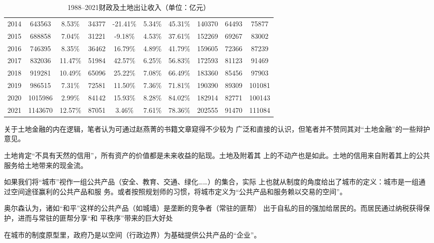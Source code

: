 \begin{table}[h]
{\begin{tabular}{@{}cccccccccc@{}}
2014 & 643563  & 8.53\%  & 34377 & -21.41\%  & 5.34\% & 45.31\% & 140370 & 64493 & 75877  \\
2015 & 688858  & 7.04\%  & 31221 & -9.18\%   & 4.53\% & 37.61\% & 152269 & 69267 & 83002  \\
2016 & 746395  & 8.35\%  & 36462 & 16.79\%   & 4.89\% & 41.79\% & 159605 & 72366 & 87239  \\
2017 & 832036  & 11.47\% & 51984 & 42.57\%   & 6.25\% & 56.83\% & 172593 & 81123 & 91469  \\
2018 & 919281  & 10.49\% & 65096 & 25.22\%   & 7.08\% & 66.49\% & 183360 & 85456 & 97903  \\
2019 & 986515  & 7.31\%  & 72581 & 11.50\%   & 7.36\% & 71.81\% & 190390 & 89309 & 101081 \\
2020 & 1015986 & 2.99\%  & 84142 & 15.93\%   & 8.28\% & 84.02\% & 182914 & 82771 & 100143 \\
2021 & 1143670 & 12.57\% & 87051 & 3.46\%    & 7.61\% & 78.36\% & 202555 & 91470 & 111084 \\ \bottomrule
\end{tabular}%
}
\caption{1988--2021财政及土地出让收入（单位：亿元）}
\label{tab:19882021}
\end{table}

关于土地金融的内在逻辑，笔者认为可通过赵燕菁的书籍文章\cite{dajueqi}窥得不少较为
广泛和直接的认识，但笔者并不赞同其对“土地金融”的一些辩护意见。

土地肯定“不具有天然的信用”，所有资产的价值都是未来收益的贴现。土地及附着其
上的不动产也是如此。土地的信用来自附着其上的公共服务给土地带来的现金流。


如果我们将“城市”视作一组公共产品（安全、教育、交通、绿化……）的集合，实际
上也就从制度的角度给出了城市的定义：城市是一组通过空间途径赢利的公共产品和服
务。或者按照规划师的习惯，将城市定义为“公共产品和服务赖以交易的空间”。

奥尔森认为，诸如“和平”这样的公共产品（如城墙）是垄断的竞争者（常驻的匪帮）
出于自私的目的强加给居民的。而居民通过纳税获得保护，进而与常驻的匪帮分享“和
平秩序”带来的巨大好处

在城市的制度原型里，政府乃是以空间（行政边界）为基础提供公共产品的“企业”。


